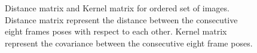 	\begin{figure}
		\centering
		\qquad
		\caption{Distance matrix and Kernel matrix for ordered set of images. Distance matrix represent the distance between the consecutive eight frames poses with respect to each other. Kernel matrix represent the covariance between the consecutive eight frame poses.}%
		\label{fig:ordered_D_and_K}%
	\end{figure}
	
